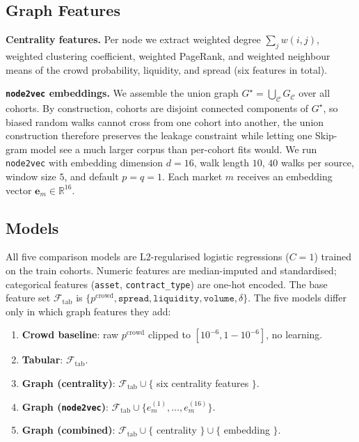 \documentclass{article} %
\begin{document}
\subsection{Graph Features}

\textbf{Centrality features.} Per node we extract weighted degree $\sum_j w(i,j)$, weighted clustering coefficient, weighted PageRank, and weighted neighbour means of the crowd probability, liquidity, and spread (six features in total).

\textbf{\texttt{node2vec} embeddings.} We assemble the union graph $G^\star = \bigcup_\mathcal{C} G_\mathcal{C}$ over all cohorts. By construction, cohorts are disjoint connected components of $G^\star$, so biased random walks cannot cross from one cohort into another, the union construction therefore preserves the leakage constraint while letting one Skip-gram model see a much larger corpus than per-cohort fits would. We run \texttt{node2vec} \citep{grover2016} with embedding dimension $d=16$, walk length $10$, $40$ walks per source, window size $5$, and default $p=q=1$. Each market $m$ receives an embedding vector $\mathbf{e}_m \in \mathbb{R}^{16}$.

\subsection{Models}

All five comparison models are L2-regularised logistic regressions ($C = 1$) trained on the train cohorts. Numeric features are median-imputed and standardised; categorical features (\texttt{asset}, \texttt{contract\_type}) are one-hot encoded. The base feature set $\mathcal{F}_{\text{tab}}$ is $\{p^{\text{crowd}}, \texttt{spread}, \texttt{liquidity}, \texttt{volume}, \delta\}$. The five models differ only in which graph features they add:
\begin{enumerate}[leftmargin=*,itemsep=2pt,topsep=2pt]
\item \textbf{Crowd baseline}: raw $p^{\text{crowd}}$ clipped to $[10^{-6}, 1-10^{-6}]$, no learning.
\item \textbf{Tabular}: $\mathcal{F}_{\text{tab}}$.
\item \textbf{Graph (centrality)}: $\mathcal{F}_{\text{tab}} \cup \{$ six centrality features $\}$.
\item \textbf{Graph (\texttt{node2vec})}: $\mathcal{F}_{\text{tab}} \cup \{e_m^{(1)}, \dots, e_m^{(16)}\}$.
\item \textbf{Graph (combined)}: $\mathcal{F}_{\text{tab}} \cup \{$ centrality $\} \cup \{$ embedding $\}$.
\end{enumerate}
\end{document}
